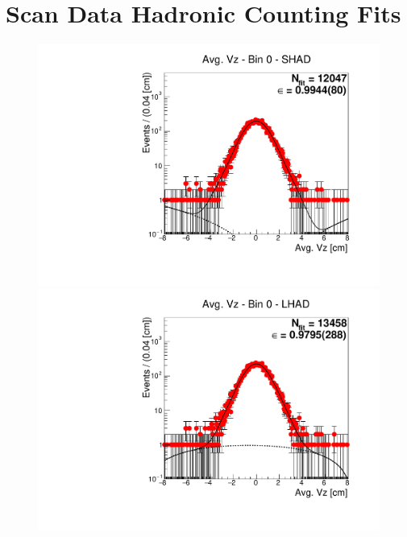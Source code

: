 \chapter{Scan Data Hadronic Counting Fits}
\label{app:nonDDbar_hadron_counts_scan}

\begin{figure}[H]
\centering
\includegraphics[scale=0.25]{figures/plots/nonDDbar_fit_results/scan/fit_scan_00_data_SHAD.pdf}
\hspace{-0.5cm}
\includegraphics[scale=0.25]{figures/plots/nonDDbar_fit_results/scan/fit_scan_00_data_LHAD.pdf}
\hspace{-0.5cm}

\end{figure}
